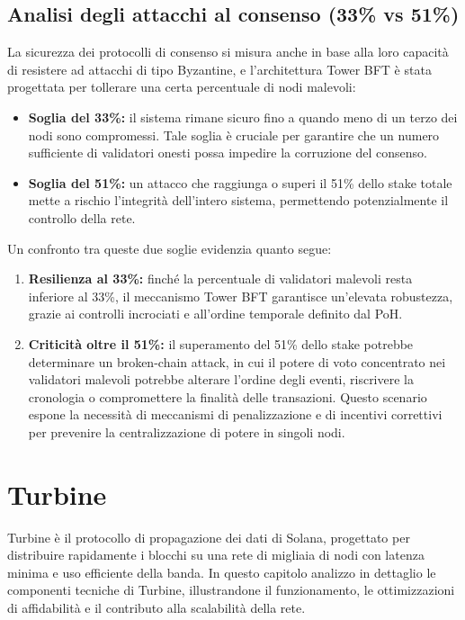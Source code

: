 \documentclass[a4paper,12pt]{report}
\begin{document}
	\subsection{Analisi degli attacchi al consenso (33\% vs 51\%)}
	La sicurezza dei protocolli di consenso si misura anche in base alla loro capacità di resistere ad attacchi di tipo Byzantine, e l’architettura Tower BFT è stata progettata per tollerare una certa percentuale di nodi malevoli:
	\begin{itemize}
		\item \textbf{Soglia del 33\%:} il sistema rimane sicuro fino a quando meno di un terzo dei nodi sono compromessi. Tale soglia è cruciale per garantire che un numero sufficiente di validatori onesti possa impedire la corruzione del consenso.
		\item \textbf{Soglia del 51\%:} un attacco che raggiunga o superi il 51\% dello stake totale mette a rischio l’integrità dell’intero sistema, permettendo potenzialmente il controllo della rete.
	\end{itemize}
	Un confronto tra queste due soglie evidenzia quanto segue:
	\begin{enumerate}
		\item \textbf{Resilienza al 33\%:} finché la percentuale di validatori malevoli resta inferiore al 33\%, il meccanismo Tower BFT garantisce un’elevata robustezza, grazie ai controlli incrociati e all’ordine temporale definito dal PoH.
		\item \textbf{Criticità oltre il 51\%:} il superamento del 51\% dello stake potrebbe determinare un broken-chain attack, in cui il potere di voto concentrato nei validatori malevoli potrebbe alterare l’ordine degli eventi, riscrivere la cronologia o compromettere la finalità delle transazioni. Questo scenario espone la necessità di meccanismi di penalizzazione e di incentivi correttivi per prevenire la centralizzazione di potere in singoli nodi.
	\end{enumerate}
	
	\section{Turbine}
	
	Turbine è il protocollo di propagazione dei dati di Solana, progettato per distribuire rapidamente i blocchi su una rete di migliaia di nodi con latenza minima e uso efficiente della banda. In questo capitolo analizzo in dettaglio le componenti tecniche di Turbine, illustrandone il funzionamento, le ottimizzazioni di affidabilità e il contributo alla scalabilità della rete.
	
\end{document}
